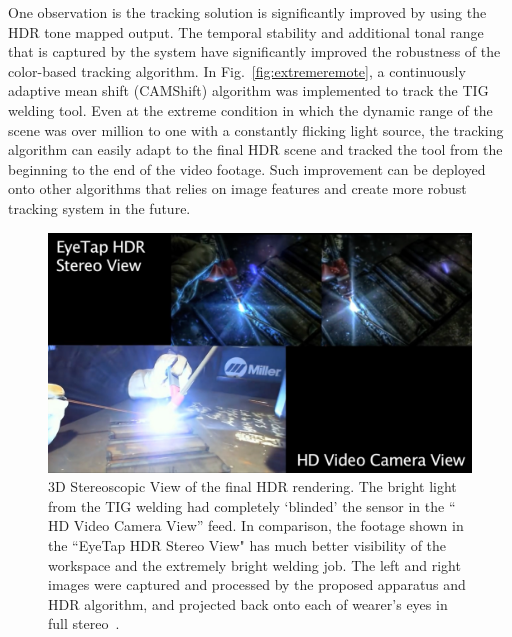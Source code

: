 One observation is the tracking solution is significantly improved by using the HDR tone mapped 
output. The temporal stability and additional tonal range that is captured by the system have 
significantly improved the robustness of the color-based tracking algorithm. In 
Fig.~\ref{fig:extremeremote}, a continuously adaptive mean shift (CAMShift) algorithm 
\cite{bradski1998real} was implemented to track the TIG welding tool. Even at the extreme condition 
in which the dynamic range of the scene was over million to one with a constantly flicking light 
source, the tracking algorithm can easily adapt to the final HDR scene and tracked the tool from the 
beginning to the end of the video footage. Such improvement can be deployed onto other algorithms 
that relies on image features and create more robust tracking system in the future.

\begin{figure}
\center
 \includegraphics[width=5.5in]{ch2/diagrams/eyetap_3d_view.jpg}
 \caption{3D Stereoscopic View of the final HDR rendering. The bright light from the TIG welding had 
completely `blinded' the sensor in the `` HD Video Camera View'' feed. In comparison, the footage 
shown in the ``EyeTap HDR Stereo View" has much better visibility of the workspace and the 
extremely bright welding job. The left and right images were captured and processed by the 
proposed apparatus and HDR algorithm, and projected back onto each of wearer's eyes in full 
stereo~\cite{mann2012hdrchitecture}.}
 \label{fig:extreme3dhdr}
\end{figure}


